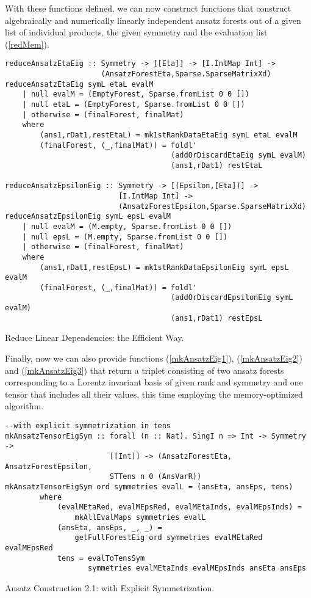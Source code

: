 With these functions defined, we can now construct functions that construct algebraically and numerically linearly independent ansatz forests out of a given list of individual products, the given symmetry and the evaluation list (\ref{redMem}).
\begin{listing}[hbt!]
\begin{verbatim}
reduceAnsatzEtaEig :: Symmetry -> [[Eta]] -> [I.IntMap Int] ->
                      (AnsatzForestEta,Sparse.SparseMatrixXd)
reduceAnsatzEtaEig symL etaL evalM
    | null evalM = (EmptyForest, Sparse.fromList 0 0 [])
    | null etaL = (EmptyForest, Sparse.fromList 0 0 [])
    | otherwise = (finalForest, finalMat)
    where
        (ans1,rDat1,restEtaL) = mk1stRankDataEtaEig symL etaL evalM
        (finalForest, (_,finalMat)) = foldl' 
                                      (addOrDiscardEtaEig symL evalM)
                                      (ans1,rDat1) restEtaL

reduceAnsatzEpsilonEig :: Symmetry -> [(Epsilon,[Eta])] ->
                          [I.IntMap Int] ->
                          (AnsatzForestEpsilon,Sparse.SparseMatrixXd)
reduceAnsatzEpsilonEig symL epsL evalM
    | null evalM = (M.empty, Sparse.fromList 0 0 [])
    | null epsL = (M.empty, Sparse.fromList 0 0 [])
    | otherwise = (finalForest, finalMat)
    where
        (ans1,rDat1,restEpsL) = mk1stRankDataEpsilonEig symL epsL evalM
        (finalForest, (_,finalMat)) = foldl'
                                      (addOrDiscardEpsilonEig symL evalM)
                                      (ans1,rDat1) restEpsL
\end{verbatim} 
\caption{Reduce Linear Dependencies: the Efficient Way.}\label{redMem}
\end{listing}
Finally, now we can also provide functions (\ref{mkAnsatzEig1}), (\ref{mkAnsatzEig2}) and (\ref{mkAnsatzEig3}) that return a triplet consisting of two ansatz forests corresponding to a Lorentz invariant basis of given rank and symmetry and one tensor that includes all their values, this time employing the memory-optimized algorithm. 
\begin{listing}[hbt!]
\begin{verbatim}
--with explicit symmetrization in tens
mkAnsatzTensorEigSym :: forall (n :: Nat). SingI n => Int -> Symmetry ->
                        [[Int]] -> (AnsatzForestEta, AnsatzForestEpsilon,
                        STTens n 0 (AnsVarR))
mkAnsatzTensorEigSym ord symmetries evalL = (ansEta, ansEps, tens)
        where
            (evalMEtaRed, evalMEpsRed, evalMEtaInds, evalMEpsInds) =
                mkAllEvalMaps symmetries evalL 
            (ansEta, ansEps, _, _) =
                getFullForestEig ord symmetries evalMEtaRed evalMEpsRed
            tens = evalToTensSym
                   symmetries evalMEtaInds evalMEpsInds ansEta ansEps
\end{verbatim} 
\caption{Ansatz Construction 2.1: with Explicit Symmetrization.}\label{mkAnsatzEig1}
\end{listing}
